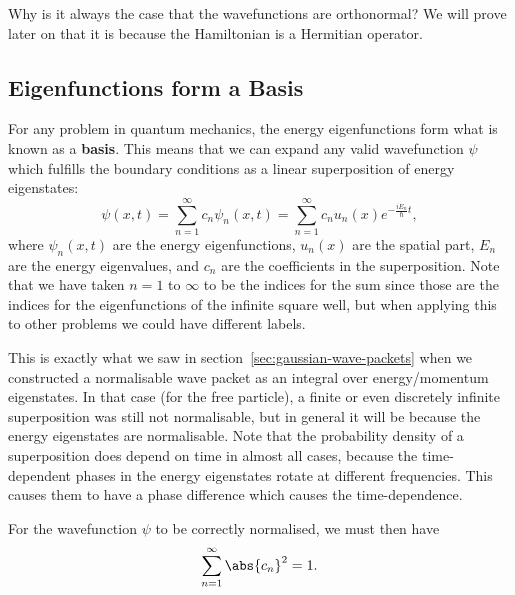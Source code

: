 \documentclass[../quantum_mechanics.tex]{subfiles}
\begin{document}
            Why is it always the case that the wavefunctions are orthonormal?
            We will prove later on that it is because the Hamiltonian is a Hermitian operator.

        \subsection{Eigenfunctions form a Basis}\label{sec:properties-of-energy-eigenstates:subsec:eigenfunctions-form-a-basis}
            For any problem in quantum mechanics, the energy eigenfunctions form what is known as a \textbf{basis}.
            This means that we can expand any valid wavefunction $\psi$ which fulfills the boundary conditions as a linear superposition of energy eigenstates:
            \begin{equation}\label{eq:superposition-time-evolution}
                \psi(x,t)=\sum_{n=1}^\infty c_n\psi_n(x,t)=\sum_{n=1}^\infty c_nu_n(x)e^{-\frac{iE_n}{\hbar}t},
            \end{equation}
            where $\psi_n(x,t)$ are the energy eigenfunctions, $u_n(x)$ are the spatial part, $E_n$ are the energy eigenvalues, and $c_n$ are the coefficients in the superposition.
            Note that we have taken $n=1$ to $\infty$ to be the indices for the sum since those are the indices for the eigenfunctions of the infinite square well, but when applying this to other problems we could have different labels.

            This is exactly what we saw in section~\ref{sec:gaussian-wave-packets} when we constructed a normalisable wave packet as an integral over energy/momentum eigenstates.
            In that case (for the free particle), a finite or even discretely infinite superposition was still not normalisable, but in general it will be because the energy eigenstates are normalisable.
            Note that the probability density of a superposition does depend on time in almost all cases, because the time-dependent phases in the energy eigenstates rotate at different frequencies.
            This causes them to have a phase difference which causes the time-dependence.

            For the wavefunction $\psi$ to be correctly normalised, we must then have
            \begin{equation}
                \sum_{n=1}^\infty\abs{c_n}^2=1.
            \end{equation}
\end{document}
